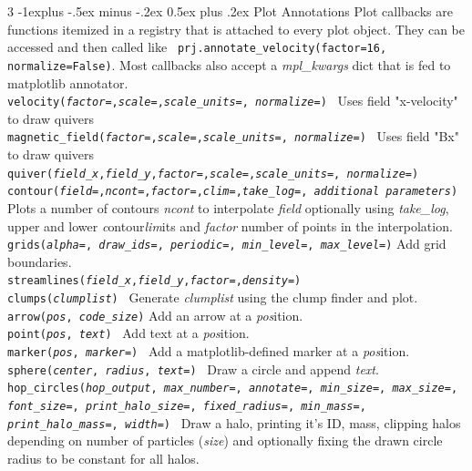 \documentclass[10pt,landscape]{article}
\makeatletter
\renewcommand{\subsection}{\@startsection{subsection}{2}{0mm}%
                                {-1explus -.5ex minus -.2ex}%
                                {0.5ex plus .2ex}%
                                {\normalfont\normalsize\bfseries}}
\makeatother
\begin{document}
\begin{multicols}{3}
\subsection{Plot Annotations}
Plot callbacks are functions itemized in a registry that is attached to every plot object. They can be accessed and then called like \texttt{ prj.annotate\_velocity(factor=16, normalize=False)}. Most callbacks also accept a \textit{mpl\_kwargs} dict that is fed to matplotlib annotator. \\
\texttt{velocity(\textit{factor=},\textit{scale=},\textit{scale\_units=}, \textit{normalize=})} \textemdash\ Uses field "x-velocity" to draw quivers\\
\texttt{magnetic\_field(\textit{factor=},\textit{scale=},\textit{scale\_units=}, \textit{normalize=})} \textemdash\ Uses field "Bx" to draw quivers\\
\texttt{quiver(\textit{field\_x},\textit{field\_y},\textit{factor=},\textit{scale=},\textit{scale\_units=}, \textit{normalize=})} \\
\texttt{contour(\textit{field=},\textit{ncont=},\textit{factor=},\textit{clim=},\textit{take\_log=}, \textit{additional parameters})} \textemdash Plots a number of contours \textit{ncont} to interpolate \textit{field} optionally using \textit{take\_log}, upper and lower \textit{c}ontour\textit{lim}its and \textit{factor} number of points in the interpolation.\\
\texttt{grids(\textit{alpha=}, \textit{draw\_ids=}, \textit{periodic=}, \textit{min\_level=}, \textit{max\_level=})} \textemdash Add grid boundaries. \\
\texttt{streamlines(\textit{field\_x},\textit{field\_y},\textit{factor=},\textit{density=})}\\
\texttt{clumps(\textit{clumplist})} \textemdash\ Generate \textit{clumplist} using the clump finder and plot. \\
\texttt{arrow(\textit{pos}, \textit{code\_size})} Add an arrow at a \textit{pos}ition. \\
\texttt{point(\textit{pos}, \textit{text})} \textemdash\ Add text at a \textit{pos}ition. \\
\texttt{marker(\textit{pos}, \textit{marker=})} \textemdash\ Add a matplotlib-defined marker at a \textit{pos}ition. \\
\texttt{sphere(\textit{center}, \textit{radius}, \textit{text=})} \textemdash\ Draw a circle and append \textit{text}.\\
\texttt{hop\_circles(\textit{hop\_output}, \textit{max\_number=}, \textit{annotate=}, \textit{min\_size=}, \textit{max\_size=}, \textit{font\_size=}, \textit{print\_halo\_size=}, \textit{fixed\_radius=}, \textit{min\_mass=}, \textit{print\_halo\_mass=}, \textit{width=})} \textemdash\ Draw a halo, printing it's ID, mass, clipping halos depending on number of particles (\textit{size}) and optionally fixing the drawn circle radius to be constant for all halos.\\

\end{multicols}
\end{document}
